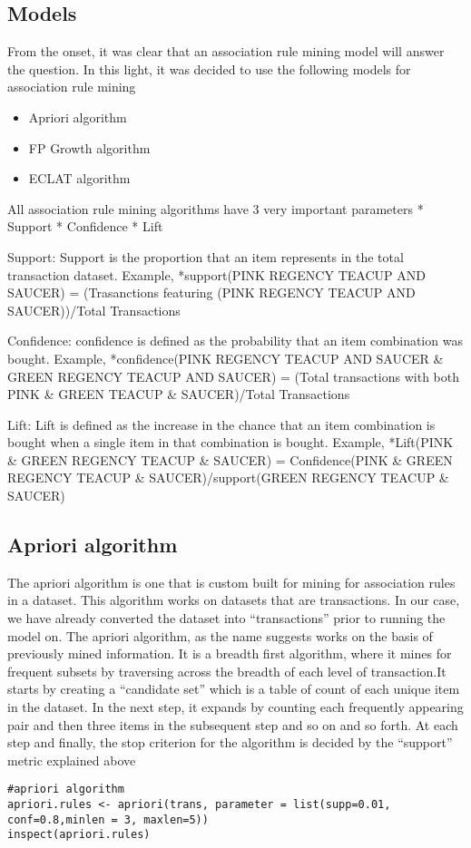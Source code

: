\documentclass[
]{article}
\providecommand{\tightlist}{%
  \setlength{\itemsep}{0pt}\setlength{\parskip}{0pt}}
\begin{document}
\hypertarget{models}{%
\subsection{Models}\label{models}}

From the onset, it was clear that an association rule mining model will
answer the question. In this light, it was decided to use the following
models for association rule mining

\begin{itemize}
\tightlist
\item
  Apriori algorithm
\item
  FP Growth algorithm
\item
  ECLAT algorithm
\end{itemize}

All association rule mining algorithms have 3 very important parameters
* Support * Confidence * Lift

Support: Support is the proportion that an item represents in the total
transaction dataset. Example, *support(PINK REGENCY TEACUP AND SAUCER) =
(Trasanctions featuring (PINK REGENCY TEACUP AND SAUCER))/Total
Transactions

Confidence: confidence is defined as the probability that an item
combination was bought. Example, *confidence(PINK REGENCY TEACUP AND
SAUCER \& GREEN REGENCY TEACUP AND SAUCER) = (Total transactions with
both PINK \& GREEN TEACUP \& SAUCER)/Total Transactions

Lift: Lift is defined as the increase in the chance that an item
combination is bought when a single item in that combination is bought.
Example, *Lift(PINK \& GREEN REGENCY TEACUP \& SAUCER) = Confidence(PINK
\& GREEN REGENCY TEACUP \& SAUCER)/support(GREEN REGENCY TEACUP \&
SAUCER)

\hypertarget{apriori-algorithm}{%
\subsection{Apriori algorithm}\label{apriori-algorithm}}

The apriori algorithm is one that is custom built for mining for
association rules in a dataset. This algorithm works on datasets that
are transactions. In our case, we have already converted the dataset
into ``transactions'' prior to running the model on. The apriori
algorithm, as the name suggests works on the basis of previously mined
information. It is a breadth first algorithm, where it mines for
frequent subsets by traversing across the breadth of each level of
transaction.It starts by creating a ``candidate set'' which is a table
of count of each unique item in the dataset. In the next step, it
expands by counting each frequently appearing pair and then three items
in the subsequent step and so on and so forth. At each step and finally,
the stop criterion for the algorithm is decided by the ``support''
metric explained above

\begin{verbatim}
#apriori algorithm
apriori.rules <- apriori(trans, parameter = list(supp=0.01, conf=0.8,minlen = 3, maxlen=5))
inspect(apriori.rules)
\end{verbatim}
\end{document}

